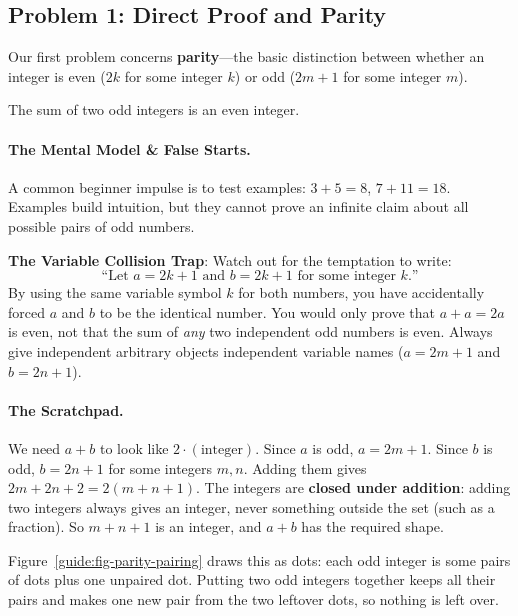 \subsection{Problem 1: Direct Proof and Parity}

Our first problem concerns \textbf{parity}---the basic distinction between whether an integer is even ($2k$ for some integer $k$) or odd ($2m + 1$ for some integer $m$).

\begin{theorem}
The sum of two odd integers is an even integer.
\end{theorem}

\paragraph{The Mental Model \& False Starts.}
A common beginner impulse is to test examples: $3 + 5 = 8$, $7 + 11 = 18$. Examples build intuition, but they cannot prove an infinite claim about all possible pairs of odd numbers. 

\begin{trapbox}
\textbf{The Variable Collision Trap}: Watch out for the temptation to write:
\[
\text{``Let $a = 2k + 1$ and $b = 2k + 1$ for some integer $k$.''}
\]
By using the same variable symbol $k$ for both numbers, you have accidentally forced $a$ and $b$ to be the identical number. You would only prove that $a + a = 2a$ is even, not that the sum of \emph{any} two independent odd numbers is even. Always give independent arbitrary objects independent variable names ($a = 2m + 1$ and $b = 2n + 1$).
\end{trapbox}

\paragraph{The Scratchpad.}
We need $a + b$ to look like $2 \cdot (\text{integer})$. Since $a$ is odd, $a = 2m + 1$. Since $b$ is odd, $b = 2n + 1$ for some integers $m, n$. Adding them gives $2m + 2n + 2 = 2(m + n + 1)$. The integers are \textbf{closed under addition}: adding two integers always gives an integer, never something outside the set (such as a fraction). So $m + n + 1$ is an integer, and $a + b$ has the required shape.

Figure~\ref{guide:fig-parity-pairing} draws this as dots: each odd integer is some pairs of dots plus one unpaired dot. Putting two odd integers together keeps all their pairs and makes one new pair from the two leftover dots, so nothing is left over.

